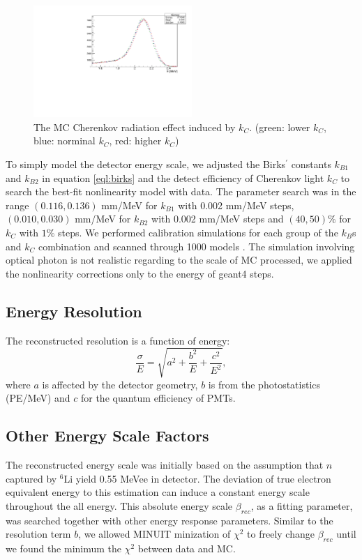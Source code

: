 \begin{figure}[h!]
\centering
\includegraphics[width=60mm]{figures/kc.pdf}
\caption{The MC Cherenkov radiation effect induced by $k_{C}$. (green: lower $k_{C}$, blue: norminal $k_{C}$, red: higher $k_{C}$)}
\label{fig:kcplot}
\end{figure}

To simply model the detector energy scale, we adjusted the Birks$^\prime$ constants $k_{B1}$ and $k_{B2}$ in equation \ref{eql:birks} and the detect efficiency of Cherenkov light $k_C$ to search the best-fit nonlinearity model with data. The parameter search was in the range $(0.116, 0.136)$ mm/MeV for $k_{B1}$ with 0.002 mm/MeV steps, $(0.010, 0.030)$ mm/MeV for $k_{B2}$ with 0.002 mm/MeV steps and $(40, 50)\%$ for $k_C$ with $1\%$ steps. 
We performed calibration simulations for each group of the $k_B$s and $k_C$ combination and scanned through 1000 models .
The simulation involving optical photon is not realistic regarding to the scale of MC processed, we applied the nonlinearity corrections only to the energy of geant4 steps.

\subsection{Energy Resolution}
\label{sec:resolution}
The reconstructed resolution is a function of energy:
\begin{equation}
\label{eql:resolution}
    \frac{\sigma}{E} = \sqrt{a^2 + \frac{b^2}{E}+\frac{c^2}{E^2}},
\end{equation}
where $a$ is affected by the detector geometry, $b$ is from the photostatistics (PE/MeV) and $c$ for the quantum efficiency of PMTs.


\subsection{Other Energy Scale Factors}
\label{sec:other}
The reconstructed energy scale was initially based on the assumption that $n$ captured by $^6$Li yield 0.55 MeVee in detector. 
The deviation of true electron equivalent energy to this estimation can induce a constant energy scale throughout the all energy. 
This absolute energy scale $\beta_{rec}$, as a fitting parameter, was searched together with other energy response parameters.
Similar to the resolution term $b$, we allowed MINUIT minization of $\chi^2$ to freely change $\beta_{rec}$ until we found the minimum the $\chi^2$ between data and MC.

